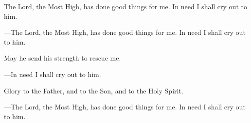 \responsory
\begin{hangpar}

The Lord, the Most High, has done good things for me.
In need I shall cry out to him.

{\color{red}---\thinspace}The Lord, the Most High, has done good things for me.
In need I shall cry out to him.

\medskip May he send his strength to rescue me.

{\color{red}---\thinspace}In need I shall cry out to him.

\medskip Glory to the Father, and to the Son, and to the Holy Spirit.

{\color{red}---\thinspace}The Lord, the Most High, has done good things for me.
In need I shall cry out to him.
\end{hangpar}
